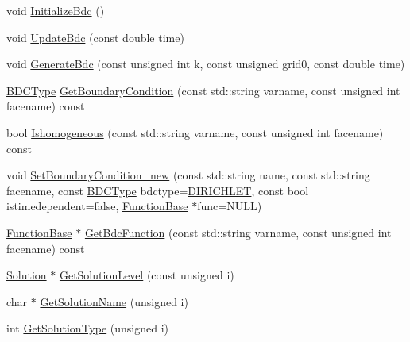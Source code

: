 \begin{DoxyCompactItemize}
\item 
void \mbox{\hyperlink{classfemus_1_1_multi_level_solution_a7dab34eb82a90ff8035142048e9284e8}{Initialize\+Bdc}} ()
\item 
void \mbox{\hyperlink{classfemus_1_1_multi_level_solution_a50da205c6e2bb976ecbe64aee18beb84}{Update\+Bdc}} (const double time)
\item 
void \mbox{\hyperlink{classfemus_1_1_multi_level_solution_a7ea9a2163b506be744fea42550e4e26e}{Generate\+Bdc}} (const unsigned int k, const unsigned grid0, const double time)
\item 
\mbox{\hyperlink{_b_d_c_type_enum_8hpp_ac1efcf28f6f152fe5354b888f616668d}{B\+D\+C\+Type}} \mbox{\hyperlink{classfemus_1_1_multi_level_solution_aac6abd2822ad5642f3214d6feabc387b}{Get\+Boundary\+Condition}} (const std\+::string varname, const unsigned int facename) const
\item 
bool \mbox{\hyperlink{classfemus_1_1_multi_level_solution_ac275b90171e6a33628c4fe5ebf9860a1}{Ishomogeneous}} (const std\+::string varname, const unsigned int facename) const
\item 
void \mbox{\hyperlink{classfemus_1_1_multi_level_solution_a8222acd002287bc27090141ef6e7ef1f}{Set\+Boundary\+Condition\+\_\+new}} (const std\+::string name, const std\+::string facename, const \mbox{\hyperlink{_b_d_c_type_enum_8hpp_ac1efcf28f6f152fe5354b888f616668d}{B\+D\+C\+Type}} bdctype=\mbox{\hyperlink{_b_d_c_type_enum_8hpp_ac1efcf28f6f152fe5354b888f616668da1c2adefa6a3b7015b29913c49ee050c7}{D\+I\+R\+I\+C\+H\+L\+ET}}, const bool istimedependent=false, \mbox{\hyperlink{classfemus_1_1_function_base}{Function\+Base}} $\ast$func=N\+U\+LL)
\item 
\mbox{\hyperlink{classfemus_1_1_function_base}{Function\+Base}} $\ast$ \mbox{\hyperlink{classfemus_1_1_multi_level_solution_a6a772d621d92076dfe0e37e376a421b0}{Get\+Bdc\+Function}} (const std\+::string varname, const unsigned int facename) const
\item 
\mbox{\hyperlink{classfemus_1_1_solution}{Solution}} $\ast$ \mbox{\hyperlink{classfemus_1_1_multi_level_solution_afe428eaa84d414762c4cc3b8a1d4f4a7}{Get\+Solution\+Level}} (const unsigned i)
\item 
char $\ast$ \mbox{\hyperlink{classfemus_1_1_multi_level_solution_aaa655b342d5b5b9bfbd0bbe1590440d8}{Get\+Solution\+Name}} (unsigned i)
\item 
int \mbox{\hyperlink{classfemus_1_1_multi_level_solution_ac6285c5a1907ad1f93ad7b380a08dabe}{Get\+Solution\+Type}} (unsigned i)
\item 

\end{DoxyCompactItemize}
